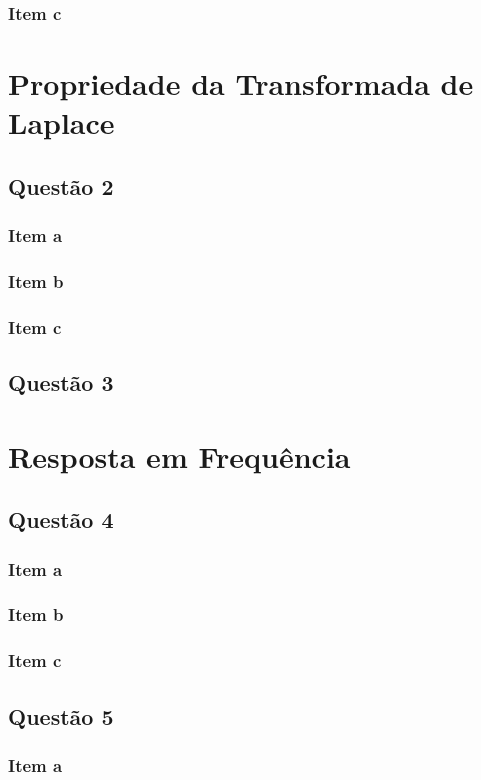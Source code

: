 \documentclass[a4paper, 12pt]{article}
\begin{document}
        \subsubsection{Item c}
\section{Propriedade da Transformada de Laplace}
    \subsection{Quest\~{a}o 2}
        \subsubsection{Item a}
        \subsubsection{Item b}
        \subsubsection{Item c}
    \subsection{Quest\~{a}o 3}
\section{Resposta em Frequ\^{e}ncia}
    \subsection{Quest\~{a}o 4}
        \subsubsection{Item a}
        \subsubsection{Item b}
        \subsubsection{Item c}
    \subsection{Quest\~{a}o 5}
        \subsubsection{Item a}
\end{document}
